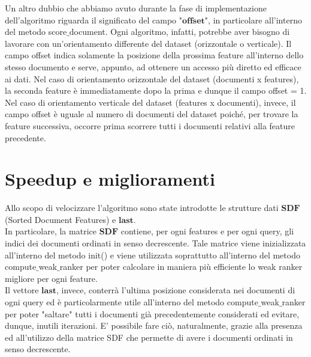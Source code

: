 Un altro dubbio che abbiamo avuto durante la fase di implementazione dell'algoritmo riguarda il significato del campo "$\textbf{offset}$", in particolare all'interno del metodo score$\_$document. Ogni algoritmo, infatti, potrebbe aver bisogno di lavorare con un'orientamento differente del dataset (orizzontale o verticale). Il campo offset indica solamente la posizione della prossima feature all'interno dello stesso documento e serve, appunto, ad ottenere un accesso più diretto ed efficace ai dati. Nel caso di orientamento orizzontale del dataset (documenti x features), la seconda feature è immediatamente dopo la prima e dunque il campo offset = 1. Nel caso di orientamento verticale del dataset (features x documenti), invece, il campo offset è uguale al numero di documenti del dataset poiché, per trovare la feature successiva, occorre prima scorrere tutti i documenti relativi alla feature precedente.\\

	\section*{Speedup e miglioramenti}
Allo scopo di velocizzare l'algoritmo sono state introdotte le strutture dati $\textbf{SDF}$ (Sorted Document Features) e $\textbf{last}$.\\
In particolare, la matrice $\textbf{SDF}$ contiene, per ogni features e per ogni query, gli indici dei documenti ordinati in senso decrescente. Tale matrice viene inizializzata all'interno del metodo init() e viene utilizzata soprattutto all'interno del metodo compute$\_$weak$\_$ranker per poter calcolare in maniera più efficiente lo weak ranker migliore per ogni feature.\\
Il vettore $\textbf{last}$, invece, conterrà l'ultima posizione considerata nei documenti di ogni query ed è particolarmente utile all'interno del metodo compute$\_$weak$\_$ranker per poter "saltare" tutti i documenti già precedentemente considerati ed evitare, dunque, inutili iterazioni. E' possibile fare ciò, naturalmente, grazie alla presenza ed all'utilizzo della matrice SDF che permette di avere i documenti ordinati in senso decrescente.

	
	
